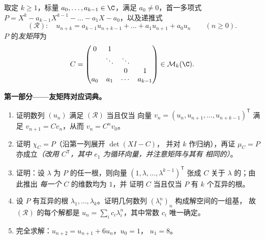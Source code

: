 \begin{problem}
\label{pb:b2:reduction:1}
取定 $k \geq 1$，标量 $a_0, \dots, a_{k-1} \in \C$，满足 $a_0
\neq 0$，首一多项式 $P = X^k - a_{k-1}X^{k-1} - \dots -
a_1 X - a_0$，以及递推式
\[
(\mathcal R)\colon\quad u_{n+k} = a_{k-1}u_{n+k-1} + \dots +
a_1 u_{n+1} + a_0 u_n \qquad (n \geq 0).
\]
$P$ 的\emph{友矩阵}为
\[
C =
\begin{pmatrix}
0 & 1 & & \\
 & \ddots & \ddots & \\
 & & 0 & 1\\
a_0 & a_1 & \cdots & a_{k-1}
\end{pmatrix}
\in \mathcal{M}_k(\C).
\]

\medskip
\noindent\textbf{第一部分——友矩阵对应词典。}
\begin{enumerate}
  \item 证明数列 $(u_n)$ 满足 $(\mathcal R)$ 当且仅当
        向量 $v_n = (u_n, u_{n+1}, \dots,
        u_{n+k-1})^{\mathsf T}$ 满足 $v_{n+1} = Cv_n$，从而
        $v_n = C^n v_0$。
  \item 证明 $\chi_C = P$（沿第一列展开 $\det(XI - C)$，
        并对 $k$ 作归纳），再证 $\mu_C = P$
        亦成立\emph{（改用 $C^{\mathsf T}$，其中 $e_1$
        为循环向量，并注意矩阵与其有
        相同的）}。
  \item 证明：设 $\lambda$ 为 $P$ 的任一根，则向量
        $(1, \lambda, \dots, \lambda^{k-1})^{\mathsf T}$ 张成
        $C$ 关于 $\lambda$ 的；由此推出
        \emph{每一个} $C$ 的维数均为 $1$，并
        证明 $C$ 当且仅当 $P$ 有 $k$
        个互异的根。
  \item 设 $P$ 有互异的根 $\lambda_1, \dots,
        \lambda_k$。证明几何数列
        $(\lambda_i^n)_n$ 构成解空间的一组基，
        故 $(\mathcal R)$ 的每个解都是 $u_n = \sum_i
        c_i\lambda_i^n$，其中常数 $c_i$ 唯一确定。
  \item 完全求解：$u_{n+2} = u_{n+1} + 6u_n$，$u_0 = 1$，
        $u_1 = 8$。
\end{enumerate}


\end{problem}
